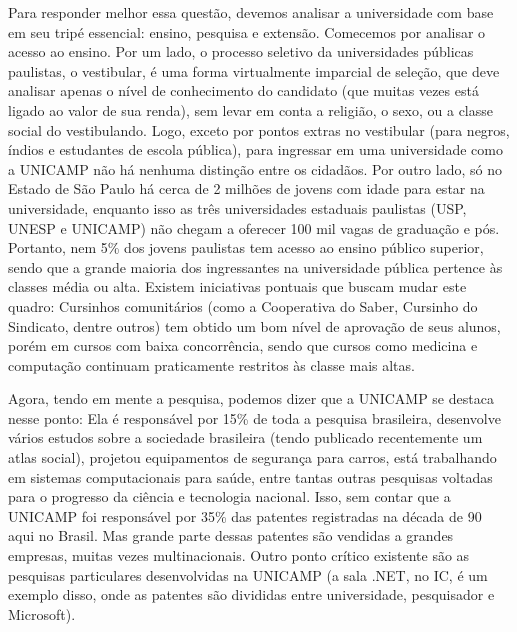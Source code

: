 Para responder melhor essa questão, devemos analisar a universidade com base em
seu tripé essencial: ensino, pesquisa e extensão. Comecemos por analisar
o acesso ao ensino. Por um lado, o processo seletivo da universidades públicas
paulistas, o vestibular, é uma forma virtualmente imparcial de seleção, que deve
analisar apenas o nível de conhecimento do candidato (que muitas vezes está
ligado ao valor de sua renda), sem levar em conta a religião, o sexo, ou
a classe social do vestibulando. Logo, exceto por pontos extras no vestibular
(para negros, índios e estudantes de escola pública), para ingressar em uma
universidade como a UNICAMP não há nenhuma distinção entre os cidadãos. Por
outro lado, só no Estado de São Paulo há cerca de 2 milhões de jovens com idade
para estar na universidade, enquanto isso as três universidades estaduais
paulistas (USP, UNESP e UNICAMP) não chegam a oferecer 100 mil vagas de
graduação e pós. Portanto, nem 5\% dos jovens paulistas tem acesso ao ensino
público superior, sendo que a grande maioria dos ingressantes na universidade
pública pertence às classes média ou alta. Existem iniciativas pontuais que
buscam mudar este quadro: Cursinhos comunitários (como a Cooperativa do Saber,
Cursinho do Sindicato, dentre outros) tem obtido um bom nível de aprovação de
seus alunos, porém em cursos com baixa concorrência, sendo que cursos como
medicina e computação continuam praticamente restritos às classe mais altas.

Agora, tendo em mente a pesquisa, podemos dizer que a UNICAMP se destaca nesse
ponto: Ela é responsável por 15\% de toda a pesquisa brasileira, desenvolve
vários estudos sobre a sociedade brasileira (tendo publicado recentemente um
atlas social), projetou equipamentos de segurança para carros, está trabalhando
em sistemas computacionais para saúde, entre tantas outras pesquisas voltadas
para o progresso da ciência e tecnologia nacional. Isso, sem contar que
a UNICAMP foi responsável por 35\% das patentes registradas na década de 90 aqui
no Brasil. Mas grande parte dessas patentes são vendidas a grandes empresas,
muitas vezes multinacionais. Outro ponto crítico existente são as pesquisas
particulares desenvolvidas na UNICAMP (a sala .NET, no IC, é um exemplo disso,
onde as patentes são divididas entre universidade, pesquisador e Microsoft).

